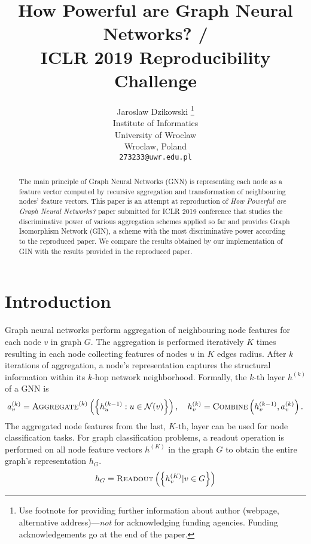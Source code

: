 \documentclass{article} %
\title{How Powerful are Graph Neural Networks? / \\ ICLR 2019 Reproducibility Challenge}
\author{Jaroslaw Dzikowski \thanks{ Use footnote for providing further information
about author (webpage, alternative address)---\emph{not} for acknowledging
funding agencies.  Funding acknowledgements go at the end of the paper.} \\
Institute of Informatics\\
University of Wroclaw\\
Wroclaw, Poland \\
\texttt{273233@uwr.edu.pl} \\
}
\begin{document}
\maketitle

\begin{abstract}
The main principle of Graph Neural Networks (GNN) is representing each node as a feature vector computed by recursive aggregation and transformation of neighbouring nodes' feature vectors. This paper is an attempt at reproduction of \textit{How Powerful are Graph Neural Networks?} paper submitted for ICLR 2019 conference that studies the discriminative power of various aggregation schemes applied so far and provides Graph Isomorphism Network (GIN), a scheme with the most discriminative power according to the reproduced paper. We compare the results obtained by our implementation of GIN with the results provided in the reproduced paper.
\end{abstract}

\section{Introduction}
Graph neural networks perform aggregation of neighbouring node features for each node $v$ in graph $G$. The aggregation is performed iteratively $K$ times resulting in each node collecting features of nodes $u$ in $K$ edges radius. After $k$ iterations of aggregation, a node’s representation captures the structural
information within its $k$-hop network neighborhood. Formally, the $k$-th layer $h^{(k)}$ of a GNN is
$$a_v^{(k)} = \textsc{Aggregate}^{(k)}\left(\left\{h_u^{(k-1)} : u \in \mathcal{N}(v)\right\}\right),\quad h_v^{(k)} = \textsc{Combine}\left(h_v^{(k-1)}, a_v^{(k)}\right).$$
The aggregated node features from the last, $K$-th, layer can be used for node classification tasks. For graph classification problems, a readout operation is performed on all node feature vectors $h^{(K)}$ in the graph $G$ to obtain the entire graph's representation $h_G$.
$$h_G = \textsc{Readout}\left(\left\{h_v^{(K)} | v \in G\right\}\right)$$
\end{document}
